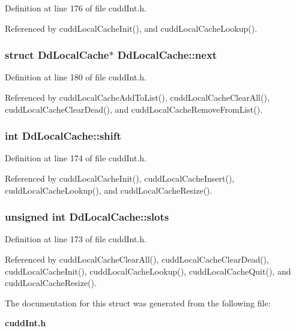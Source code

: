 Definition at line 176 of file cudd\-Int.h.

Referenced by cudd\-Local\-Cache\-Init(), and cudd\-Local\-Cache\-Lookup().
\subsubsection{\setlength{\rightskip}{0pt plus 5cm}struct \bf{Dd\-Local\-Cache}$\ast$ \bf{Dd\-Local\-Cache::next}}\label{structDdLocalCache_0db45346abb7d4d58d8631f6236341a8}




Definition at line 180 of file cudd\-Int.h.

Referenced by cudd\-Local\-Cache\-Add\-To\-List(), cudd\-Local\-Cache\-Clear\-All(), cudd\-Local\-Cache\-Clear\-Dead(), and cudd\-Local\-Cache\-Remove\-From\-List().
\subsubsection{\setlength{\rightskip}{0pt plus 5cm}int \bf{Dd\-Local\-Cache::shift}}\label{structDdLocalCache_20e93a93f7aa732e4a5a83c54284c921}




Definition at line 174 of file cudd\-Int.h.

Referenced by cudd\-Local\-Cache\-Init(), cudd\-Local\-Cache\-Insert(), cudd\-Local\-Cache\-Lookup(), and cudd\-Local\-Cache\-Resize().
\subsubsection{\setlength{\rightskip}{0pt plus 5cm}unsigned int \bf{Dd\-Local\-Cache::slots}}\label{structDdLocalCache_81d92a3508761cdf2f169e421ca7b7ab}




Definition at line 173 of file cudd\-Int.h.

Referenced by cudd\-Local\-Cache\-Clear\-All(), cudd\-Local\-Cache\-Clear\-Dead(), cudd\-Local\-Cache\-Init(), cudd\-Local\-Cache\-Lookup(), cudd\-Local\-Cache\-Quit(), and cudd\-Local\-Cache\-Resize().

The documentation for this struct was generated from the following file:\begin{CompactItemize}
\item 
\bf{cudd\-Int.h}\end{CompactItemize}
